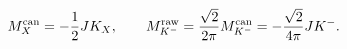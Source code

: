 \begin{equation}
M_X^{\rm can}=-\frac12 J K_X,\qquad
M_{K^-}^{\rm raw}=\frac{\sqrt2}{2\pi}M_{K^-}^{\rm can}=-\frac{\sqrt2}{4\pi}J K^-.
\end{equation}
